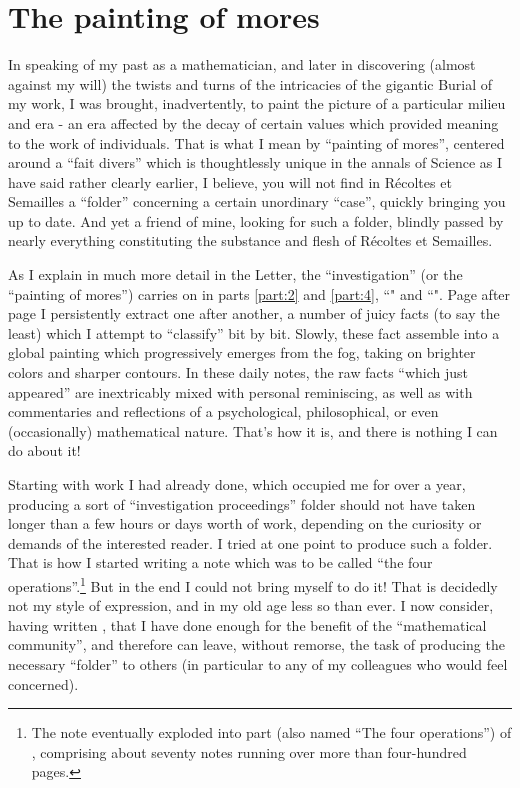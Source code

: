 \section{The painting of mores}

In speaking of my past as a mathematician, and later in discovering (almost against my
will) the twists and turns of the intricacies of the gigantic Burial of my work, I was
brought, inadvertently, 
to paint the picture of a particular milieu and era - an era
affected by the decay of certain values
which provided meaning to the work of individuals.
That is what I mean by
``painting of mores'', centered around a 
``fait divers'' which is thoughtlessly unique in the annals of Science
as I have said rather clearly earlier, I believe, you will not find in 
R\'ecoltes et Semailles
a ``folder'' concerning a certain unordinary ``case'', quickly bringing you up to date.
And yet a friend of mine, looking for such a folder, 
blindly passed by nearly
everything constituting the substance and flesh of 
R\'ecoltes et Semailles.

As I explain in much more detail in the Letter, the ``investigation'' (or the ``painting
of mores'') carries on in 
parts \ref{part:2} and \ref{part:4},
``" and ``".
Page after page I persistently extract one after another, 
a number of juicy facts (to say the least) which I attempt to ``classify''
bit by bit. Slowly, these fact
assemble into a global painting which progressively 
emerges from the fog, taking on brighter colors and 
sharper contours.
In these daily notes, the raw facts
``which just appeared''
are inextricably mixed with personal
reminiscing, as well as with commentaries and reflections of a psychological,
philosophical, or even (occasionally) mathematical nature.
That's how it is, and there is nothing I can do about it!

Starting with work I had already done, 
which occupied me for over a year, producing 
a sort of ``investigation proceedings'' folder
should not have taken longer than a few hours 
or days worth of work, depending
on the curiosity or demands of the interested reader.
I tried at one point to produce such a folder. 
That is how I started writing a note which was to be called ``the four
operations''.\footnote{The note eventually exploded into part 
(also named ``The four operations'') of \rec, comprising about seventy notes 
running over more than four-hundred pages.}
But in the end I could not bring myself to do it!
That is decidedly
not my style of expression, and in my old age less so than ever.
I now consider, having written \rec, 
that I have done enough for the benefit of the ``mathematical community'', 
and therefore can leave, without remorse, 
the task of producing 
the necessary ``folder'' to others (in particular to any of my
colleagues who would feel concerned). 

